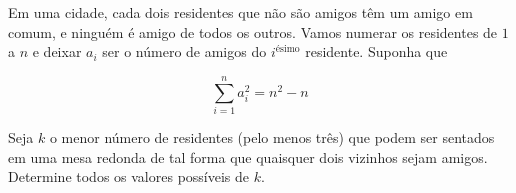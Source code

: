Em uma cidade, cada dois residentes que não são amigos têm um amigo em comum, e ninguém é amigo de todos os outros. Vamos numerar os residentes de \(1\) a \(n\) e deixar \(a_i\) ser o número de amigos do \(i^{\text{ésimo}}\) residente. Suponha que

\[
\sum_{i=1}^{n}a_i^2=n^2-n
\]

Seja \(k\) o menor número de residentes (pelo menos três) que podem ser sentados em uma mesa redonda de tal forma que quaisquer dois vizinhos sejam amigos. Determine todos os valores possíveis de \(k\).
